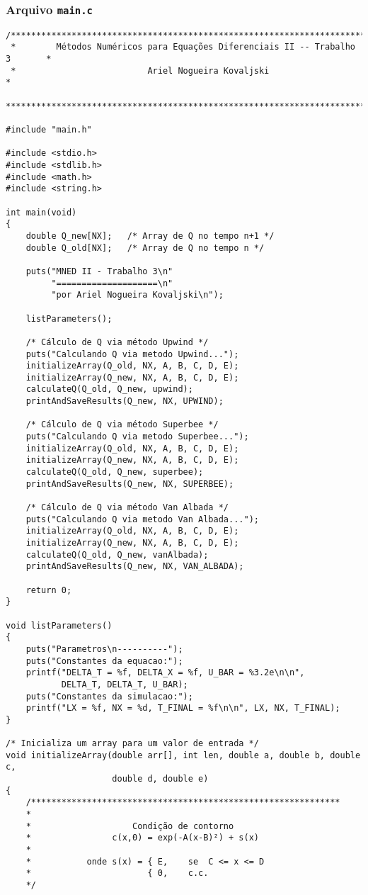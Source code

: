 \subsubsection{Arquivo \texttt{main.c}}
\begin{Verbatim}[fontsize=\footnotesize]
/******************************************************************************
 *        Métodos Numéricos para Equações Diferenciais II -- Trabalho 3       *
 *                          Ariel Nogueira Kovaljski                          *
 ******************************************************************************/

#include "main.h"

#include <stdio.h>
#include <stdlib.h>
#include <math.h>
#include <string.h>

int main(void)
{
    double Q_new[NX];   /* Array de Q no tempo n+1 */
    double Q_old[NX];   /* Array de Q no tempo n */

    puts("MNED II - Trabalho 3\n"
         "====================\n"
         "por Ariel Nogueira Kovaljski\n");

    listParameters();

    /* Cálculo de Q via método Upwind */
    puts("Calculando Q via metodo Upwind...");
    initializeArray(Q_old, NX, A, B, C, D, E);
    initializeArray(Q_new, NX, A, B, C, D, E);
    calculateQ(Q_old, Q_new, upwind);
    printAndSaveResults(Q_new, NX, UPWIND);

    /* Cálculo de Q via método Superbee */
    puts("Calculando Q via metodo Superbee...");
    initializeArray(Q_old, NX, A, B, C, D, E);
    initializeArray(Q_new, NX, A, B, C, D, E);
    calculateQ(Q_old, Q_new, superbee);
    printAndSaveResults(Q_new, NX, SUPERBEE);

    /* Cálculo de Q via método Van Albada */
    puts("Calculando Q via metodo Van Albada...");
    initializeArray(Q_old, NX, A, B, C, D, E);
    initializeArray(Q_new, NX, A, B, C, D, E);
    calculateQ(Q_old, Q_new, vanAlbada);
    printAndSaveResults(Q_new, NX, VAN_ALBADA);

    return 0;
}

void listParameters()
{
    puts("Parametros\n----------");
    puts("Constantes da equacao:");
    printf("DELTA_T = %f, DELTA_X = %f, U_BAR = %3.2e\n\n",
           DELTA_T, DELTA_T, U_BAR);
    puts("Constantes da simulacao:");
    printf("LX = %f, NX = %d, T_FINAL = %f\n\n", LX, NX, T_FINAL);
}

/* Inicializa um array para um valor de entrada */
void initializeArray(double arr[], int len, double a, double b, double c,
                     double d, double e)
{
    /*************************************************************
    *
    *                    Condição de contorno
    *                c(x,0) = exp(-A(x-B)²) + s(x)
    *
    *           onde s(x) = { E,    se  C <= x <= D
    *                       { 0,    c.c.
    */


\end{Verbatim}
